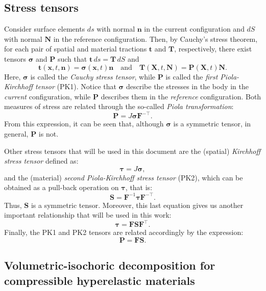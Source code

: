 \documentclass{sfuthesis}
\numberwithin{equation}{section}
\numberwithin{figure}{chapter}
\numberwithin{table}{chapter}
\theoremstyle{definition}
\def\*#1{{\mathbf{#1}}} %
\newcommand{\T}{\top}
\def\bsigma{{\bm{\sigma}}}
\def\btau{{\bm{\tau}}}
\begin{document}
\subsection{Stress tensors}

Consider surface elements $ds$ with normal $\*n$ in the current configuration and $dS$ with normal $\*N$ in the reference configuration. Then, by Cauchy's stress theorem, for each pair of spatial and material tractions $\*t$ and $\*T$, respectively, there exist tensors $\bsigma$ and $\*P$ such that $\*t \, ds = \*T \, dS$ and
\begin{equation}
    \*t(\*x,t,\*n) = \bsigma(\*x,t) \*n \quad \text{and} \quad  \*T(\*X,t,\*N) = \*P(\*X,t)\*N.
\end{equation}
Here, $\bsigma$ is called the \textit{Cauchy stress tensor}, while $\*P$ is called the \textit{first Piola-Kirchhoff tensor} (PK1). Notice that $\bsigma$ describe the stresses in the body in the \textit{current} configuration, while $\*P$ describes them in the \textit{reference} configuration. Both measures of stress are related through the so-called \textit{Piola transformation}:
\begin{equation} \label{eq:def_PK1}
    \*P = J \bsigma \*F^{-\T}.
\end{equation}
From this expression, it can be seen that, although $\bsigma$ is a symmetric tensor, in general, $\*P$ is not.

Other stress tensors that will be used in this document are the (spatial) \textit{Kirchhoff stress tensor} defined as:
\begin{equation}
    \btau = J \bsigma,
\end{equation}
and the (material) \textit{second Piola-Kirchhoff stress tensor} (PK2), which can be obtained as a pull-back operation on $\btau$, that is:
\begin{equation} \label{eq:def_PK2}
    \*S = \*F^{-1} \btau \*F^{-\T}.
\end{equation}
Thus, $\*S$ is a symmetric tensor. Moreover, this last equation gives us another important relationship that will be used in this work:
\begin{equation} \label{eq:push_forward_tau}
\btau = \*F \*S \*F^{\T}.
\end{equation}
Finally, the PK1 and PK2 tensors are related accordingly by the expression:
\begin{equation}
\*P = \*F \*S.
\end{equation}

\subsection{Volumetric-isochoric decomposition for compressible hyperelastic materials}
\label{sec:vol_isochoric_decomposition}
\end{document}

